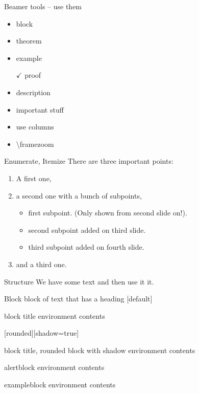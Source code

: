 \begin{frame}{Beamer tools -- use them}
  \begin{itemize}
  \item block
  \item theorem
  \item<2> example
  \item[$\checkmark$] proof
  \item description
  \item \alert{important stuff}
  \item use columns
  \item \textbackslash{}framezoom
  \end{itemize}
\end{frame}


\begin{frame}{Enumerate, Itemize}
  There are three important points:
  \begin{enumerate}
    \item<1-> A first one,
    \item<2-> a second one with a bunch of subpoints,
  \begin{itemize}
    \item first subpoint. (Only shown from second slide on!).
    \item<3-> second subpoint added on third slide.
    \item<4-> third subpoint added on fourth slide.
  \end{itemize}
    \item<5-> and a third one.
  \end{enumerate}
\end{frame}


\begin{frame}{Structure}
  We have some text and then use  it it.
\end{frame}

\begin{frame}{Block}
  block of text that has a heading
  [default]
  \begin{block}{block title}
  environment contents
  \end{block}
  [rounded][shadow=true]
  \begin{block}{block title, rounded block with shadow}
  environment contents
  \end{block}
  \begin{alertblock}{alertblock}
  environment contents
  \end{alertblock}
  \begin{exampleblock}{exampleblock}
  environment contents
  \end{exampleblock}
\end{frame}


